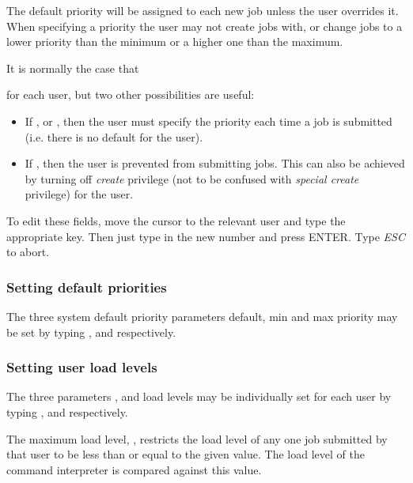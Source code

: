 The default priority will be assigned to each new job unless the user
overrides it. When specifying a priority the user may not create jobs
with, or change jobs to a lower priority than the minimum or a higher
one than the maximum.

It is normally the case that

\begin{expara}


\end{expara}

for each user, but two other possibilities are useful:

\begin{itemize}
\item If , or
, then the user
must specify the priority each time a job is submitted (i.e. there is
no default for the user).
\item If , then the
user is prevented from submitting jobs. This can also be achieved by
turning off \textit{create} privilege (not to be confused with
\textit{special create} privilege) for the user.
\end{itemize}
To edit these fields, move the cursor to the relevant user and type the
appropriate key. Then just type in the new number and press ENTER. Type
\textit{ESC} to abort.

\subsubsection{Setting default priorities}
The three system default priority parameters
default, min and max priority may be set by typing ,  and
 respectively.

\subsubsection[Setting user load levels]{Setting user load levels}
The three parameters ,
 and  load
levels may be individually set for each user by typing
,  and  respectively.

The maximum load level, , restricts the load
level of any one job submitted by that user to be less than or equal to
the given value. The load level of the command interpreter is compared
against this value.

